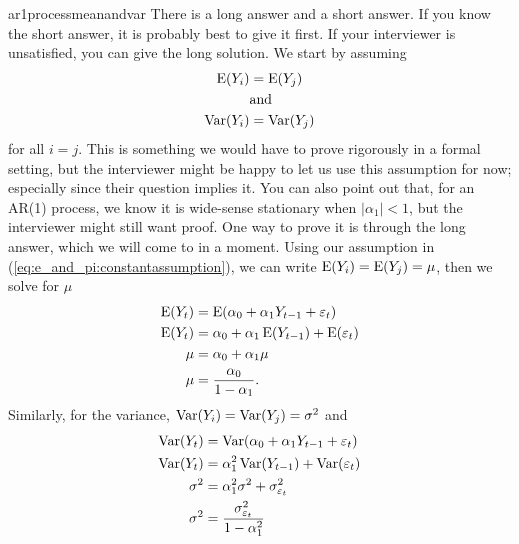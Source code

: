 \begin{answer}{ar1processmeanandvar}
There is a long answer and a short answer.
If you know the short answer, it is probably best to give it first.
If your interviewer is unsatisfied, you can give the long solution.
We start by assuming
\begin{equation}
\label{eq:e_and_pi:constantassumption}
\begin{aligned}
\operatorname{\mathrm{E}}(Y_i) &= \operatorname{\mathrm{E}}(Y_j) \\
    &\text{and}    \\
\operatorname{\mathrm{Var}}(Y_i) &= \operatorname{\mathrm{Var}}(Y_j)
\end{aligned}
\end{equation}
for all $i = j$.
This is something we would have to prove rigorously in a formal setting, but the interviewer might be happy to let us use this assumption for now; especially since their question implies it.
You can also point out that, for an AR(1) process, we know it is wide-sense stationary when
$|\alpha_1| < 1$,
but the interviewer might still want proof.
One way to prove it is through the long answer, which we will come to in a moment.
Using our assumption in (\ref{eq:e_and_pi:constantassumption}), we can write
$\operatorname{\mathrm{E}}(Y_i) = \operatorname{\mathrm{E}}(Y_j) = \mu$, then we solve for $\mu$
\begin{align*}
  \operatorname{\mathrm{E}}(Y_t) &= \operatorname{\mathrm{E}}(\alpha_0 + \alpha_1 Y_{t-1} + \varepsilon_{t}) \\
  \operatorname{\mathrm{E}}(Y_t) &= \alpha_0 + \alpha_1 \operatorname{\mathrm{E}}(Y_{t-1}) + \operatorname{\mathrm{E}}(\varepsilon_{t}) \\
   \mu    &= \alpha_0 + \alpha_1   \mu \\
   \mu    &= \frac{ \alpha_0}{1-\alpha_1}
   \text{.}
\end{align*}
Similarly, for the variance,
$\operatorname{\mathrm{Var}}(Y_i) = \operatorname{\mathrm{Var}}(Y_j) = \sigma^2$ and
\begin{align*}
  \operatorname{\mathrm{Var}}(Y_t) &= \operatorname{\mathrm{Var}}(\alpha_0 + \alpha_1 Y_{t-1} + \varepsilon_{t}) \\
  \operatorname{\mathrm{Var}}(Y_t) &=  \alpha_1^2 \operatorname{\mathrm{Var}}(Y_{t-1}) + \operatorname{\mathrm{Var}}(\varepsilon_{t}) \\
  \sigma^2  &=  \alpha_1^2 \sigma^2 + \sigma^2_{\varepsilon_{t}} \\
  \sigma^2  &=  \frac{ \sigma^2_{\varepsilon_{t}}}{1- \alpha_1^2}
\end{align*}


\end{answer}
